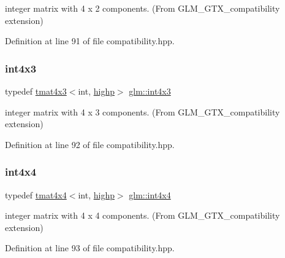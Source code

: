 integer matrix with 4 x 2 components. (From G\+L\+M\+\_\+\+G\+T\+X\+\_\+compatibility extension) 



Definition at line 91 of file compatibility.\+hpp.

\mbox{\label{group__gtx__compatibility_ga08b035f86b94428f5913e48a4a074e97}} 
\subsubsection{\texorpdfstring{int4x3}{int4x3}}
{\footnotesize\ttfamily typedef \mbox{\hyperlink{structglm_1_1tmat4x3}{tmat4x3}}$<$int, \mbox{\hyperlink{namespaceglm_a0f04f086094c747d227af4425893f545ac6f7eab42eacbb10d59a58e95e362074}{highp}}$>$ \mbox{\hyperlink{group__gtx__compatibility_ga08b035f86b94428f5913e48a4a074e97}{glm\+::int4x3}}}



integer matrix with 4 x 3 components. (From G\+L\+M\+\_\+\+G\+T\+X\+\_\+compatibility extension) 



Definition at line 92 of file compatibility.\+hpp.

\mbox{\label{group__gtx__compatibility_ga1e72ab0f7e57aae3d07ef8880c11d8b7}} 
\subsubsection{\texorpdfstring{int4x4}{int4x4}}
{\footnotesize\ttfamily typedef \mbox{\hyperlink{structglm_1_1tmat4x4}{tmat4x4}}$<$int, \mbox{\hyperlink{namespaceglm_a0f04f086094c747d227af4425893f545ac6f7eab42eacbb10d59a58e95e362074}{highp}}$>$ \mbox{\hyperlink{group__gtx__compatibility_ga1e72ab0f7e57aae3d07ef8880c11d8b7}{glm\+::int4x4}}}



integer matrix with 4 x 4 components. (From G\+L\+M\+\_\+\+G\+T\+X\+\_\+compatibility extension) 



Definition at line 93 of file compatibility.\+hpp.



